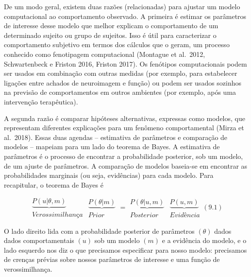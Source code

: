 \documentclass[
  12pt,
]{book}
\begin{document}
De um modo geral, existem duas razões (relacionadas) para ajustar um modelo computacional ao comportamento observado. A primeira é estimar os parâmetros de interesse desse modelo que melhor explicam o comportamento de um determinado sujeito ou grupo de sujeitos. Isso é útil para caracterizar o comportamento subjetivo em termos dos cálculos que o geram, um processo conhecido como fenotipagem computacional (Montague et al.~2012, Schwartenbeck e Friston 2016, Friston 2017). Os fenótipos computacionais podem ser usados em combinação com outras medidas (por exemplo, para estabelecer ligações entre achados de neuroimagem e função) ou podem ser usados sozinhos na previsão de comportamentos em outros ambientes (por exemplo, após uma intervenção terapêutica).

A segunda razão é comparar hipóteses alternativas, expressas como modelos, que representam diferentes explicações para um fenômeno comportamental (Mirza et al.~2018). Essas duas agendas -- estimativa de parâmetros e comparação de modelos -- mapeiam para um lado do teorema de Bayes. A estimativa de parâmetros é o processo de encontrar a probabilidade posterior, sob um modelo, de um ajuste de parâmetros. A comparação de modelos baseia-se em encontrar as probabilidades marginais (ou seja, evidências) para cada modelo. Para recapitular, o teorema de Bayes é

\[ \begin{matrix}\underbrace {P(u|\theta,m)} \\ Verossimilhança \end{matrix}
\begin{matrix}\underbrace {P(\theta|m)} \\ Prior \end{matrix}
= \begin{matrix}\underbrace {P(\theta|u, m)} \\ Posterior \end{matrix}
\begin{matrix}\underbrace {P(u,m)} \\ Evidência \end{matrix}
(9.1)\]

O lado direito lida com a probabilidade posterior de parâmetros \((\theta)\) dados dados comportamentais \((u)\) sob um modelo \((m)\) e a evidência do modelo, e o lado esquerdo nos diz o que precisamos especificar para nosso modelo: precisamos de crenças prévias sobre nossos parâmetros de interesse e uma função de verossimilhança.
\end{document}

